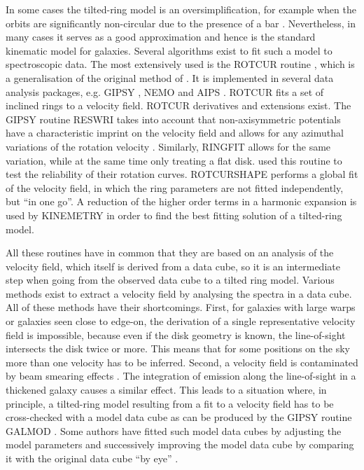 \documentclass[oldversion]{aa}
\newcommand{\cng}[1]{{#1}}
\begin{document}
In some cases the tilted-ring model is an oversimplification, for
example when the orbits are significantly non-circular due to
the presence of a bar \citep[e.g.][]{Bosma78,Simon03}.  Nevertheless,
\cng{in} many cases it serves as a good approximation and hence is
the standard kinematic model for galaxies.  Several algorithms exist
to fit such a model to spectroscopic data. The
most extensively used is the ROTCUR routine
\citep[][]{Albada85,Begemann87}, which is a generalisation of the
original method of \citet[][]{Warner73}.  It is implemented in several
data analysis packages, e.g.  GIPSY \citep[][]{Hulst92}, NEMO
\citep[][]{Teuben95} and AIPS \citep[][]{Fomalont81}.  ROTCUR fits
a set of inclined rings to a velocity field.  ROTCUR derivatives and extensions exist.  The GIPSY
routine RESWRI takes into account that non-axisymmetric potentials have
a characteristic imprint on the velocity field
\citep[][]{Binney78,Teuben91} and allows for any azimuthal variations of
the rotation velocity \citep[see also][]{Franx94,Schoenmakers97}. 
Similarly, RINGFIT \citep[][]{Simon03} allows for the same variation,
while at the same time only treating a flat disk.  \citet[][]{Simon05}
use\cng{d} this routine to test the reliability of their rotation curves. 
ROTCURSHAPE \citep[implemented in NEMO,][]{Teuben95} performs a global
fit of the velocity field, in which the ring parameters are not fitted
independently, but ``in one go''.  A reduction of the higher order terms
in a harmonic expansion is used by \cng{KINEMETRY} \citep[][]{Krajnovic06} in
order to find the best fitting solution of a tilted-ring model. 

All these routines have in common that they are based on an analysis
of the velocity field, which itself is  derived from a data cube, so
it is an intermediate step when going from the observed data cube to a
tilted ring model.  Various methods exist to extract a velocity field
by analysing  the spectra in a data cube.  All of these
methods have their shortcomings.  First, for galaxies with large warps
or galaxies seen close to edge-on, the derivation of a single
representative velocity field is impossible, because even if the disk
geometry is known, the line-of-sight  intersects the disk twice or
more.  This means that for some positions on the sky more than one
velocity has to be inferred.  Second, a velocity field is contaminated by beam smearing
effects \citep[see below, also][]{Teuben02}.  The integration of
emission along the line-of-sight in a thickened galaxy causes a
similar effect.  This leads to a situation where, in principle, a
tilted-ring model resulting from a fit to a velocity field has to be
cross-checked with a model data cube as can be produced by the
GIPSY routine GALMOD \citep[][ originally designed by T.S.  van
Albada]{Hulst92}. \cng{Some authors have fitted such model data
cubes by adjusting the model parameters and
successively} improving the model data cube by comparing it with the
original data cube ``by eye'' \citep[][]{Arnaboldi93,Swaters99,Gentile04}. 
\end{document}
